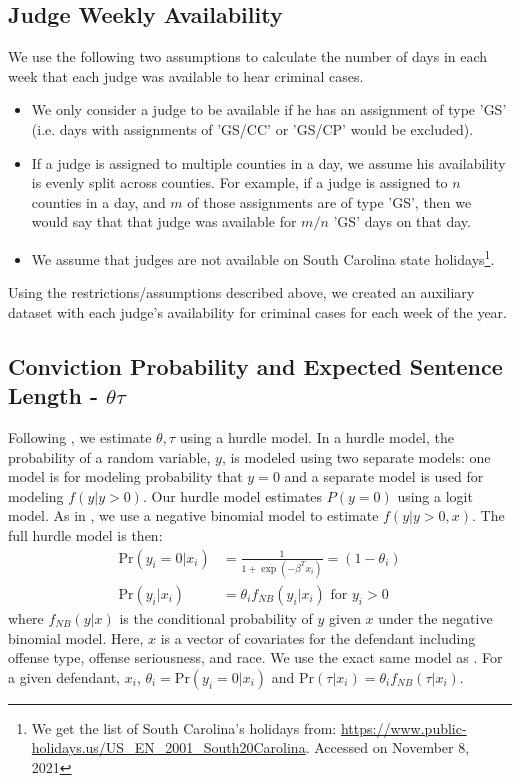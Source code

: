 \documentclass[11pt, oneside]{article}   	%
\theoremstyle{ModifiedStyle}
\begin{document}
  \subsection{Judge Weekly Availability}
	  We use the following two assumptions to calculate the number of days in each week that each judge was available to
		hear criminal cases.
		\begin{itemize}
			\item We only consider a judge to be available if he has an assignment of type 'GS' (i.e. days with assignments of 'GS/CC' or 'GS/CP' would be excluded).
			\item If a judge is assigned to multiple counties in a day, we assume his availability is evenly split across counties. For example, if a judge is assigned to $n$ counties in a day, and $m$ of those assignments are of type 'GS', then we would say that that judge was available for $m/n$ 'GS' days on that day.
			\item We assume that judges are not available on South Carolina state holidays\footnote{We get the list of South Carolina's holidays from: \url{https://www.public-holidays.us/US_EN_2001_South20Carolina}. Accessed on November 8, 2021}.
		\end{itemize}

		Using the restrictions/assumptions described above, we created an auxiliary dataset with each judge's availability for criminal cases for each week of the year.

  \subsection{Conviction Probability and Expected Sentence Length - $\theta \tau$}
	  \label{theta-tau-estimation}

		Following \cite{hester2017conditional}, we estimate $\theta,\tau$ using a hurdle model. In a hurdle model, the probability of a random variable, $y$, is modeled using two separate models: one model is for modeling probability that $y=0$ and a separate model is used for modeling $f(y|y>0)$. Our hurdle model estimates $P(y=0)$ using a logit model. As in \cite{hester2017conditional}, we use a negative binomial model to estimate $f(y|y>0,x)$. The full hurdle model is then:
		\begin{align*}
		  \text{Pr}(y_i=0|x_i) &= \frac{1}{1+\exp(-\beta^Tx_i)} = (1-\theta_i)\\
			\text{Pr}(y_i|x_i) &= \theta_i f_{NB}(y_i|x_i) \text{ for } y_i > 0
		\end{align*}
		where $f_{NB}(y|x)$ is the conditional probability of $y$ given $x$ under the negative binomial model. Here, $x$ is a vector of covariates for the defendant including offense type, offense seriousness, and race. We use the exact same model as \cite{hester2017conditional}. For a given defendant, $x_i$,  $\theta_i =\text{Pr}(y_i=0|x_i)$ and $ \text{Pr}(\tau|x_i) = \theta_i f_{NB}(\tau|x_i)$.
\end{document}
